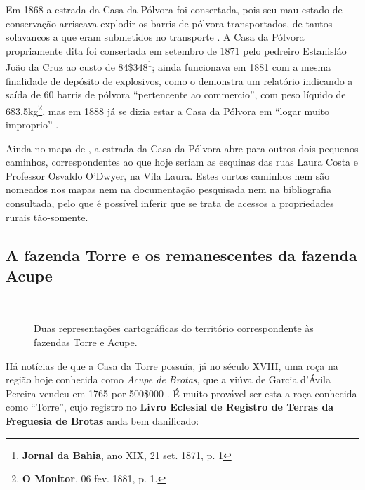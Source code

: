 Em 1868 a estrada da Casa da Pólvora foi consertada, pois seu mau estado de conservação arriscava explodir os barris de pólvora transportados, de tantos solavancos a que eram submetidos no transporte \cite[anexo~G,~p.~9]{bahia_anexosrelatorio_1868}. A Casa da Pólvora propriamente dita foi consertada em setembro de 1871 pelo pedreiro Estanisláo João da Cruz ao custo de 84\$348\footnote{\textbf{Jornal da Bahia}, ano XIX, 21 set. 1871, p. 1}; ainda funcionava em 1881 com a mesma finalidade de depósito de explosivos, como o demonstra um relatório indicando a saída de 60 barris de pólvora ``pertencente ao commercio'', com peso líquido de 683,5kg\footnote{\textbf{O Monitor}, 06 fev. 1881, p. 1.}, mas em 1888 já se dizia estar a Casa da Pólvora em ``logar muito improprio'' \cite[vol.~3,~p.~40]{bahia_relatorio_1888}. 

Ainda no mapa de , a estrada da Casa da Pólvora abre para outros dois pequenos caminhos, correspondentes ao que hoje seriam as esquinas das ruas Laura Costa e Professor Osvaldo O'Dwyer, na Vila Laura. Estes curtos caminhos nem são nomeados nos mapas nem na documentação pesquisada nem na bibliografia consultada, pelo que é possível inferir que se trata de acessos a propriedades rurais tão-somente.

\subsection{A fazenda Torre e os remanescentes da fazenda Acupe}

\begin{figure}[!htp]
\centering
{}
\  %
\caption{Duas representações cartográficas do território correspondente às fazendas Torre e Acupe.}
\end{figure}

Há notícias de que a Casa da Torre possuía, já no século XVIII, uma roça na região hoje conhecida como \textit{Acupe de Brotas}, que a viúva de Garcia d'Ávila Pereira vendeu em 1765 por 500\$000 \cite[p.~10]{ott_engenhos_1996}. É muito provável ser esta a roça conhecida como ``Torre'', cujo registro no \textbf{Livro Eclesial de Registro de Terras da Freguesia de Brotas} anda bem danificado:

